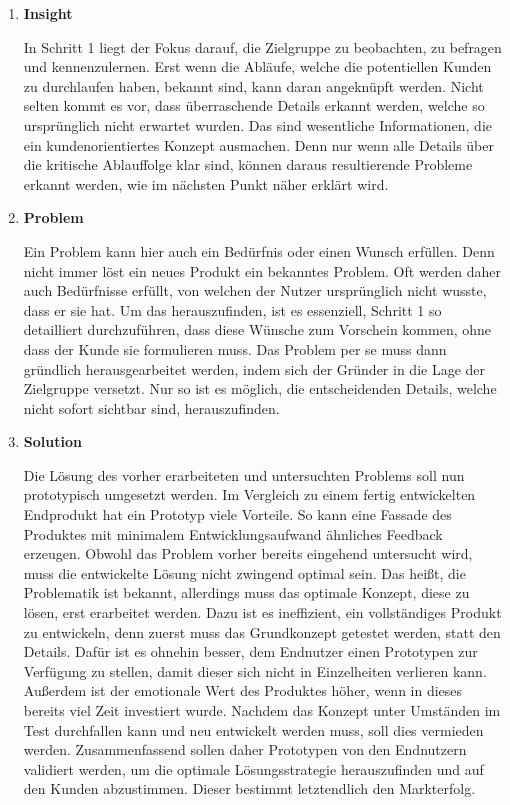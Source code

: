 \begin{enumerate}
	\item \textbf{Insight}
	
	In Schritt 1 liegt der Fokus darauf, die Zielgruppe zu beobachten, zu befragen und kennenzulernen. Erst wenn die Abläufe, welche die potentiellen Kunden zu durchlaufen haben, bekannt sind, kann daran angeknüpft werden. Nicht selten kommt es vor, dass überraschende Details erkannt werden, welche so ursprünglich nicht erwartet wurden. Das sind wesentliche Informationen, die ein kundenorientiertes Konzept ausmachen. Denn nur wenn alle Details über die kritische Ablauffolge klar sind, können daraus resultierende Probleme erkannt werden, wie im nächsten Punkt näher erklärt wird. 
	
	\item \textbf{Problem}
	
	Ein Problem kann hier auch ein Bedürfnis oder einen Wunsch erfüllen. Denn nicht immer löst ein neues Produkt ein bekanntes Problem. Oft werden daher auch Bedürfnisse erfüllt, von welchen der Nutzer ursprünglich nicht wusste, dass er sie hat. Um das herauszufinden, ist es essenziell, Schritt 1 so detailliert durchzuführen, dass diese Wünsche zum Vorschein kommen, ohne dass der Kunde sie formulieren muss. Das Problem per se muss dann gründlich herausgearbeitet werden, indem sich der Gründer in die Lage der Zielgruppe versetzt. Nur so ist es möglich, die entscheidenden Details, welche nicht sofort sichtbar sind, herauszufinden.
	
	\item \textbf{Solution}
	
	Die Lösung des vorher erarbeiteten und untersuchten Problems soll nun prototypisch umgesetzt werden. Im Vergleich zu einem fertig entwickelten Endprodukt hat ein Prototyp viele Vorteile. So kann eine Fassade des Produktes mit minimalem Entwicklungsaufwand ähnliches Feedback erzeugen. Obwohl das Problem vorher bereits eingehend untersucht wird, muss die entwickelte Lösung nicht zwingend optimal sein. Das heißt, die Problematik ist bekannt, allerdings muss das optimale Konzept, diese zu lösen, erst erarbeitet werden. Dazu ist es ineffizient, ein vollständiges Produkt zu entwickeln, denn zuerst muss das Grundkonzept getestet werden, statt den Details. Dafür ist es ohnehin besser, dem Endnutzer einen Prototypen zur Verfügung zu stellen, damit dieser sich nicht in Einzelheiten verlieren kann. Außerdem ist der emotionale Wert des Produktes höher, wenn in dieses bereits viel Zeit investiert wurde. Nachdem das Konzept unter Umständen im Test durchfallen kann und neu entwickelt werden muss, soll dies vermieden werden. Zusammenfassend sollen daher Prototypen von den Endnutzern validiert werden, um die optimale Lösungsstrategie herauszufinden und auf den Kunden abzustimmen. Dieser bestimmt letztendlich den Markterfolg.
	

\end{enumerate}
